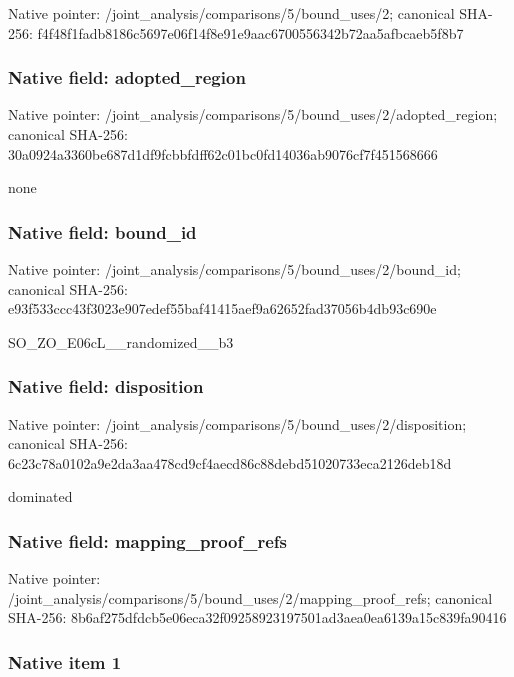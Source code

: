 \documentclass[10pt,a4paper]{article}
\begin{document}
Native pointer: /joint\_analysis/comparis\allowbreak{}ons/5/bound\_uses/2; canonical SHA-256: f4f48f1fadb8186c5697e06f\allowbreak{}14f8e91e9aac6700556342b7\allowbreak{}2aa5afbcaeb5f8b7



\subsubsection{Native field: adopted\_region}


Native pointer: /joint\_analysis/comparis\allowbreak{}ons/5/bound\_uses/2/adopt\allowbreak{}ed\_region; canonical SHA-256: 30a0924a3360be687d1df9fc\allowbreak{}bbfdff62c01bc0fd14036ab9\allowbreak{}076cf7f451568666


none


\subsubsection{Native field: bound\_id}


Native pointer: /joint\_analysis/comparis\allowbreak{}ons/5/bound\_uses/2/bound\allowbreak{}\_id; canonical SHA-256: e93f533ccc43f3023e907ede\allowbreak{}f55baf41415aef9a62652fad\allowbreak{}37056b4db93c690e


SO\_ZO\_E06cL\_\_randomized\_\_b3


\subsubsection{Native field: disposition}


Native pointer: /joint\_analysis/comparis\allowbreak{}ons/5/bound\_uses/2/dispo\allowbreak{}sition; canonical SHA-256: 6c23c78a0102a9e2da3aa478\allowbreak{}cd9cf4aecd86c88debd51020\allowbreak{}733eca2126deb18d


dominated


\subsubsection{Native field: mapping\_proof\_refs}


Native pointer: /joint\_analysis/comparis\allowbreak{}ons/5/bound\_uses/2/mappi\allowbreak{}ng\_proof\_refs; canonical SHA-256: 8b6af275dfdcb5e06eca32f0\allowbreak{}9258923197501ad3aea0ea61\allowbreak{}39a15c839fa90416



\subsubsection{Native item 1}
\end{document}
